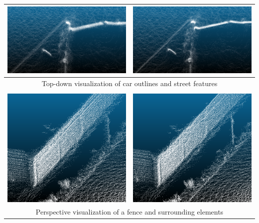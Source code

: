 \begin{table}[h]
{\begin{tabular}{cc}
            \includegraphics[width=0.44\linewidth]{images/map_compare/kitti/curb/capture_gps.png}  &
            \includegraphics[width=0.44\linewidth]{images/map_compare/kitti/curb/capture_ours.png}                    \\
            \hline
            \multicolumn{2}{c}{Top-down visualization of car outlines and street features}                            \\
            \hline                                                                                                    \\
            \includegraphics[width=0.44\linewidth]{images/map_compare/kitti/fence/capture_gps.png} &
            \includegraphics[width=0.44\linewidth]{images/map_compare/kitti/fence/capture_ours.png}                   \\
            \hline
            \multicolumn{2}{c}{Perspective visualization of a fence and surrounding elements}                         \\
            \hline
        \end{tabular}
    }


\end{table}
